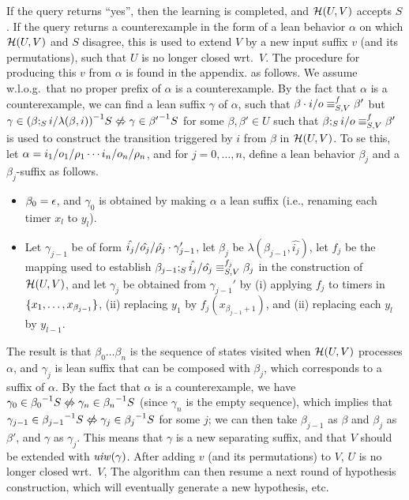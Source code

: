 If the query returns ``yes'', then
the learning is completed, and $\mathcal{H}(U,V)$ accepts $S$.
If the query returns a counterexample in the form of a lean behavior
$\alpha$ on which $\mathcal{H}(U,V)$ and $S$ disagree,
this is used to extend $V$ by a new input suffix $v$ (and its permutations),
such that
$U$ is no longer closed wrt.\ $V$.
\ifshort
The procedure for producing this $v$ from $\alpha$ is found in the
appendix.
\else
as follows.
We assume w.l.o.g.\ that no proper prefix of $\alpha$ is a counterexample. 
By the fact that $\alpha$ is a counterexample, we can find a lean
suffix $\gamma$ of $\alpha$, such that
$\beta\cdot i/o \equiv_{S,V}^f \beta'$ but
$\gamma \in \suffixbehs{S}{(\extend{\beta}{i}{\lambda(\beta,i)})}
\smallnotiff \gamma \in \suffixbehs{S}{\beta'}$
for some $\beta,\beta' \in U$ such that 
$\beta;_{S}i/o \equiv_{S,V}^f \beta'$ is used to construct
the transition triggered by $i$ from $\beta$ in $\mathcal{H}(U,V)$.
To se this, let $\alpha = i_1/o_1/\rho_1 \cdots i_n/o_n/\rho_n$, and for $j = 0 , \ldots, n$, define
a lean behavior $\beta_j$ and a $\beta_j$-suffix as follows.
\begin{itemize}
\item $\beta_0 = \epsilon$, and
  $\gamma_0$ is obtained by making $\alpha$ a lean suffix (i.e.,
  renaming each timer $x_l$ to $y_l$).
\item
  Let $\gamma_{j-1}$ be of form
  $\hat{i_j}/\hat{o_j}/\hat{\rho_j} \cdot \gamma_{j-1}'$,
  let $\beta_j$ be $\lambda(\beta_{j-1},\hat{i_j})$,
  let $f_j$ be the mapping used to establish
  $\beta_{j-1};_{S}\hat{i_j}/\hat{o_j} \equiv_{S,V}^{f_j} \beta_{j}$
  in the construction of $\mathcal{H}(U,V)$,
  and let $\gamma_j$ be obtained from $\gamma_{j-1}'$ by
  (i) applying $f_j$ to timers in $\lbrace x_1, \ldots , x_{\beta_{j-1}}\rbrace$,
  (ii) replacing $y_1$ by $f_j(x_{\beta_{j-1}+1})$, and
  (ii) replacing each $y_l$ by $y_{l-1}$.
\end{itemize}
The result is that
$\beta_0 \ldots \beta_n$ is the sequence of states 
visited when $\mathcal{H}(U,V)$ processes $\alpha$, and
$\gamma_j$ is lean suffix that can be composed with $\beta_j$,
which corresponds to a suffix of $\alpha$.
By the fact that $\alpha$ is a counterexample, we have
$\gamma_0 \in\suffixbehs{S}{\beta_0} \smallnotiff \gamma_n \in\suffixbehs{S}{\beta_n}$ (since $\gamma_n$ is the empty sequence), which implies that
$\gamma_{j-1} \in\suffixbehs{S}{\beta_{j-1}}
\smallnotiff
\gamma_{j} \in\suffixbehs{S}{\beta_{j}}$
for some $j$;
we can then take $\beta_{j-1}$ as $\beta$ and $\beta_j$ as $\beta'$, and
$\gamma$ as $\gamma_j$.
This means that $\gamma$ is a new separating suffix, and that $V$ should be
extended with $\mathit{uiw}(\gamma)$.
After adding $v$ (and its permutations) to $V$, $U$ is no longer closed
wrt.\ $V$,
\fi
The algorithm can then resume a next round of
hypothesis construction, which will eventually generate a new hypothesis, etc.

